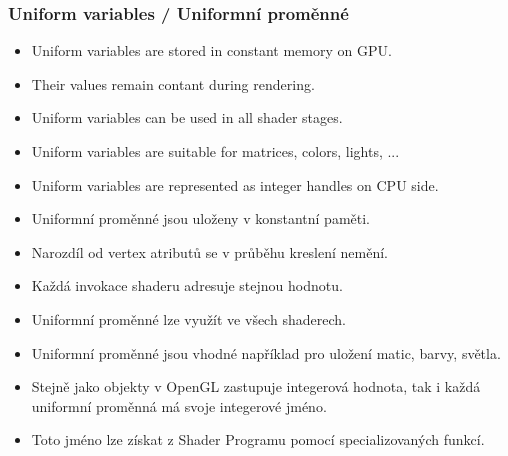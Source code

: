 
\begin{frame}[fragile]\frametitle{Uniform variables / Uniformní proměnné}
  \scriptsize
  \begin{itemize}
  \item Uniform variables are stored in constant memory on GPU.
  \item Their values remain contant during rendering.
  \item Uniform variables can be used in all shader stages.
  \item Uniform variables are suitable for matrices, colors, lights, ...
  \item Uniform variables are represented as integer handles on CPU side.
  \end{itemize}

  \begin{itemize}
  \item Uniformní proměnné jsou uloženy v konstantní paměti.
  \item Narozdíl od vertex atributů se v průběhu kreslení nemění.
  \item Každá invokace shaderu adresuje stejnou hodnotu.
  \item Uniformní proměnné lze využít ve všech shaderech.
  \item Uniformní proměnné jsou vhodné například pro uložení matic, barvy, světla.
  \item Stejně jako objekty v OpenGL zastupuje integerová hodnota, tak i každá uniformní proměnná má svoje integerové jméno.
  \item Toto jméno lze získat z Shader Programu pomocí specializovaných funkcí.
  \end{itemize}
\end{frame}

